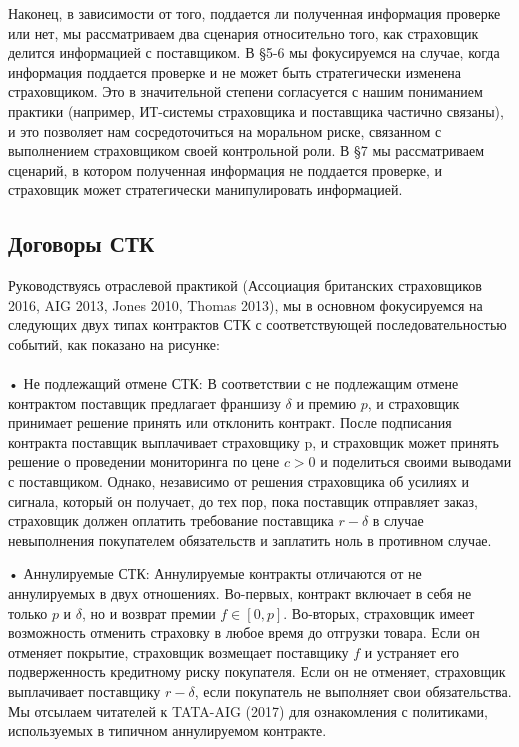 \documentclass[a4paper,12pt]{article}
\begin{document}
Наконец, в зависимости от того, поддается ли полученная информация проверке или нет, мы рассматриваем два сценария относительно того, как страховщик делится информацией с поставщиком. В §5-6 мы фокусируемся на случае, когда информация поддается проверке и не может быть стратегически изменена страховщиком. Это в значительной степени согласуется с нашим пониманием практики (например, ИТ-системы страховщика и поставщика частично связаны), и это позволяет нам сосредоточиться на моральном риске, связанном с выполнением страховщиком своей контрольной роли. В §7 мы рассматриваем сценарий, в котором полученная информация не поддается проверке, и страховщик может стратегически манипулировать информацией.

\subsection{Договоры СТК}

Руководствуясь отраслевой практикой (Ассоциация британских страховщиков 2016, AIG 2013, Jones 2010, Thomas 2013), мы в основном фокусируемся на следующих двух типах контрактов СТК с соответствующей последовательностью событий, как показано на рисунке:
\\
\\

• Не подлежащий отмене СТК: В соответствии с не подлежащим отмене контрактом поставщик предлагает франшизу $\delta$ и премию $p$, и страховщик принимает решение принять или отклонить контракт. После подписания контракта поставщик выплачивает страховщику p, и страховщик может принять решение о проведении мониторинга по цене $c > 0$ и поделиться своими выводами с поставщиком. Однако, независимо от решения страховщика об усилиях и сигнала, который он получает, до тех пор, пока поставщик отправляет заказ, страховщик должен оплатить требование поставщика $r - \delta$ в случае невыполнения покупателем обязательств и заплатить ноль в противном случае.

• Аннулируемые СТК: Аннулируемые контракты отличаются от не аннулируемых в двух отношениях. Во-первых, контракт включает в себя не только $p$ и $\delta$, но и возврат премии $f \in \left[0, p \right]$. Во-вторых, страховщик имеет возможность отменить страховку в любое время до отгрузки товара. Если он отменяет покрытие, страховщик возмещает поставщику $f$ и устраняет его подверженность кредитному риску покупателя. Если он не отменяет, страховщик выплачивает поставщику $r - \delta$, если покупатель не выполняет свои обязательства. Мы отсылаем читателей к TATA-AIG (2017) для ознакомления с политиками, используемых в типичном аннулируемом контракте.
\end{document}
